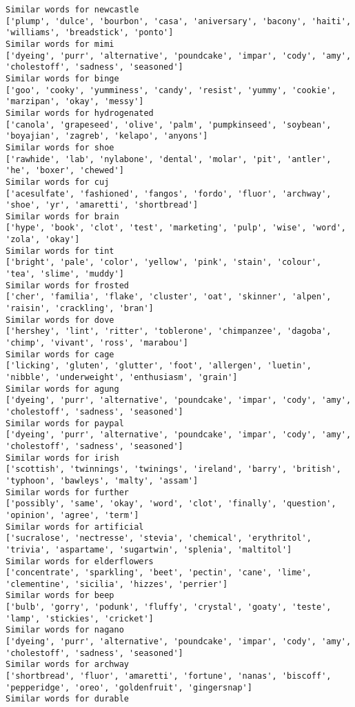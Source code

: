 \documentclass[11pt]{article}
\begin{document}
\begin{Verbatim}[commandchars=\\\{\}]
Similar words for newcastle
['plump', 'dulce', 'bourbon', 'casa', 'aniversary', 'bacony', 'haiti', 'williams', 'breadstick', 'ponto']
Similar words for mimi
['dyeing', 'purr', 'alternative', 'poundcake', 'impar', 'cody', 'amy', 'cholestoff', 'sadness', 'seasoned']
Similar words for binge
['goo', 'cooky', 'yumminess', 'candy', 'resist', 'yummy', 'cookie', 'marzipan', 'okay', 'messy']
Similar words for hydrogenated
['canola', 'grapeseed', 'olive', 'palm', 'pumpkinseed', 'soybean', 'boyajian', 'zagreb', 'kelapo', 'anyons']
Similar words for shoe
['rawhide', 'lab', 'nylabone', 'dental', 'molar', 'pit', 'antler', 'he', 'boxer', 'chewed']
Similar words for cuj
['acesulfate', 'fashioned', 'fangos', 'fordo', 'fluor', 'archway', 'shoe', 'yr', 'amaretti', 'shortbread']
Similar words for brain
['hype', 'book', 'clot', 'test', 'marketing', 'pulp', 'wise', 'word', 'zola', 'okay']
Similar words for tint
['bright', 'pale', 'color', 'yellow', 'pink', 'stain', 'colour', 'tea', 'slime', 'muddy']
Similar words for frosted
['cher', 'familia', 'flake', 'cluster', 'oat', 'skinner', 'alpen', 'raisin', 'crackling', 'bran']
Similar words for dove
['hershey', 'lint', 'ritter', 'toblerone', 'chimpanzee', 'dagoba', 'chimp', 'vivant', 'ross', 'marabou']
Similar words for cage
['licking', 'gluten', 'glutter', 'foot', 'allergen', 'luetin', 'nibble', 'underweight', 'enthusiasm', 'grain']
Similar words for agung
['dyeing', 'purr', 'alternative', 'poundcake', 'impar', 'cody', 'amy', 'cholestoff', 'sadness', 'seasoned']
Similar words for paypal
['dyeing', 'purr', 'alternative', 'poundcake', 'impar', 'cody', 'amy', 'cholestoff', 'sadness', 'seasoned']
Similar words for irish
['scottish', 'twinnings', 'twinings', 'ireland', 'barry', 'british', 'typhoon', 'bawleys', 'malty', 'assam']
Similar words for further
['possibly', 'same', 'okay', 'word', 'clot', 'finally', 'question', 'opinion', 'agree', 'term']
Similar words for artificial
['sucralose', 'nectresse', 'stevia', 'chemical', 'erythritol', 'trivia', 'aspartame', 'sugartwin', 'splenia', 'maltitol']
Similar words for elderflowers
['concentrate', 'sparkling', 'beet', 'pectin', 'cane', 'lime', 'clementine', 'sicilia', 'hizzes', 'perrier']
Similar words for beep
['bulb', 'gorry', 'podunk', 'fluffy', 'crystal', 'goaty', 'teste', 'lamp', 'stickies', 'cricket']
Similar words for nagano
['dyeing', 'purr', 'alternative', 'poundcake', 'impar', 'cody', 'amy', 'cholestoff', 'sadness', 'seasoned']
Similar words for archway
['shortbread', 'fluor', 'amaretti', 'fortune', 'nanas', 'biscoff', 'pepperidge', 'oreo', 'goldenfruit', 'gingersnap']
Similar words for durable

\end{Verbatim}
\end{document}
